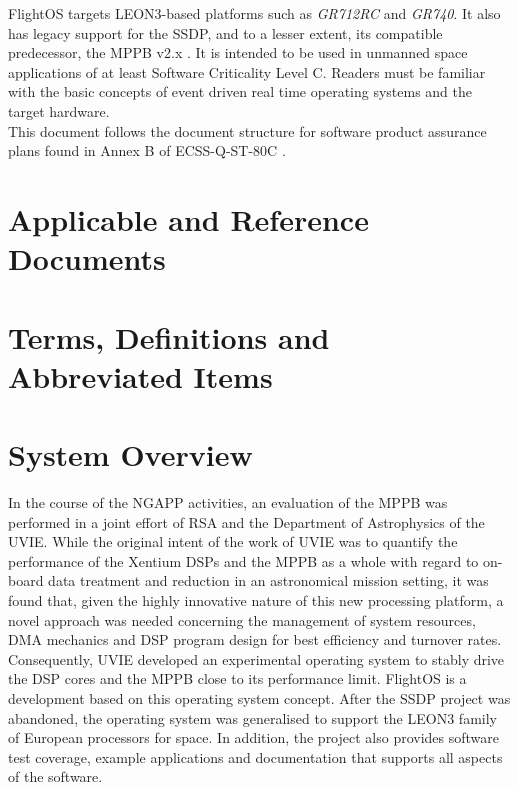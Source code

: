 \noindent
FlightOS targets \gls{LEON3}-based platforms such as
\emph{GR712RC} and \emph{GR740}. It also has legacy support for the \gls{SSDP},
and to a lesser extent, its compatible predecessor, the \gls{MPPB} v2.x \cite{MPPB}.
It is intended to be used in unmanned space applications of at least
Software Criticality Level C. Readers must be familiar with the basic concepts
of event driven real time operating systems and the target hardware. \\

\noindent
This document follows the document structure for software product assurance
plans found in Annex B of ECSS-Q-ST-80C \cite{ECSS80C}.


\chapter{Applicable and Reference Documents} %

\printbibliography[heading=none]


\chapter{Terms, Definitions and Abbreviated Items}
\printglossary[type=acronym]
\printglossary[type=main, style=altlist]


\chapter{System Overview}

In the course of the \gls{NGAPP} activities, an evaluation of the \gls{MPPB}
was performed in a joint effort of \gls{RSA} and the Department of Astrophysics
of the \gls{UVIE}. While the original intent of the work of \gls{UVIE} was to
quantify the performance of the \gls{Xentium} \glspl{DSP} and the \gls{MPPB} as a
whole with regard to on-board data treatment and reduction in an astronomical
mission setting, it was found that, given the highly innovative nature of this new
processing platform, a novel approach was needed concerning the management of
system resources, \gls{DMA} mechanics and \gls{DSP} program design for best
efficiency and turnover rates. Consequently, \gls{UVIE} developed an experimental
operating system to stably drive the \gls{DSP} cores and the \gls{MPPB} close
to its performance limit. FlightOS is a development based on this operating system
concept. After the \gls{SSDP} project was abandoned, the
operating system was generalised to support the \gls{LEON3} family of European
processors for space. In addition, the project also provides software test
coverage, example applications and documentation that supports all aspects
of the software. \\

